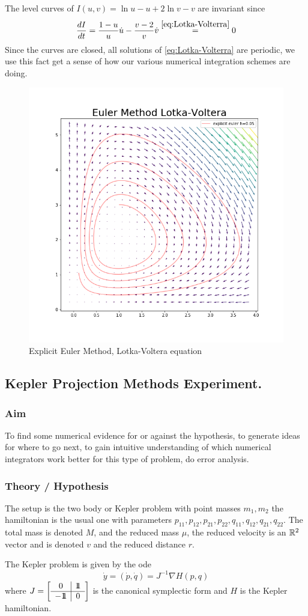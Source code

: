 \documentclass[12pt]{article}
\begin{document}
The level curves of $I(u,v) = \ln u - u + 2\ln v - v$ are invariant since 
$$
\frac{dI}{dt} = \frac{1-u}{u}\dot u - \frac{v-2}{v}\dot v \stackrel{\eqref{eq:Lotka-Volterra}}{=} 0
$$
Since the curves are closed, all solutions of \eqref{eq:Lotka-Volterra} are periodic, we use this fact get a sense of how our various numerical integration schemes are doing. 

\begin{figure}[h!]
    \centering
    \includegraphics[width=0.3\linewidth]{Figures/explicit_euler_metod_lotka_voltera.png}
    \caption{Explicit Euler Method, Lotka-Voltera equation}
    \label{fig:Explicit Euler Lotka-Voltera}
\end{figure}



\subsection{Kepler Projection Methods Experiment.}
\subsubsection{Aim}
To find some numerical evidence for or against the hypothesis, to generate ideas for where to go next, to gain intuitive understanding of which numerical integrators work better for this type of problem, do error analysis. 

\subsubsection{Theory / Hypothesis}

The setup is the two body or Kepler problem with point masses $m_1,m_2$ the hamiltonian is the usual one with parameters $p_{11},p_{12},p_{21},p_{22},q_{11},q_{12},q_{21},q_{22}$. The total mass is denoted $M$, and the reduced mass $\mu$, the reduced velocity is an $\mathbb{R}^2$ vector and is denoted $v$ and the reduced distance $r$. 

The Kepler problem is given by the ode
\begin{equation}\label{eq:ode kepler}
    \dot y = (\dot p,\dot q) = J^{-1}\nabla H(p,q)
\end{equation}
where $J = \left[\begin{array}{c|c}0&1\!\!1\\\hline-1\!\!1&0\end{array}\right]$ is the canonical symplectic form and $H$ is the Kepler hamiltonian.
\end{document}
